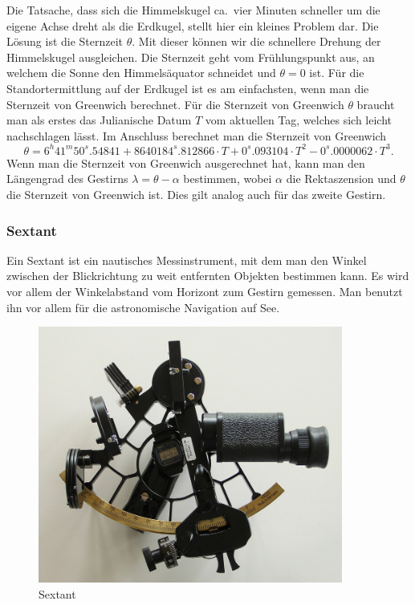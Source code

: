 Die Tatsache, dass sich die Himmelskugel  ca.~vier Minuten schneller
um die eigene Achse dreht als die Erdkugel, stellt hier ein kleines
Problem dar.
Die Lösung ist die Sternzeit $\theta$. 
%
Mit dieser können wir die schnellere Drehung der Himmelskugel ausgleichen.
Die Sternzeit geht vom Frühlungspunkt aus, an welchem die Sonne den Himmelsäquator schneidet und $\theta=0$ ist. 
Für die Standortermittlung auf der Erdkugel ist es am einfachsten, wenn man die Sternzeit von Greenwich berechnet. 
Für die Sternzeit von Greenwich $\theta$ braucht man als erstes das Julianische Datum $T$ vom aktuellen Tag, welches sich leicht nachschlagen lässt.
%
Im Anschluss berechnet man die Sternzeit von Greenwich
\[
\theta = 6^h 41^m 50^s.54841 + 8640184^s.812866 \cdot T + 0^s.093104 \cdot T^2 - 0^s.0000062 \cdot T^3.
\]
Wenn man die Sternzeit von Greenwich ausgerechnet hat, kann man den Längengrad des Gestirns $\lambda = \theta - \alpha$ bestimmen, wobei $\alpha$ die Rektaszension und $\theta$ die Sternzeit von Greenwich ist.
Dies gilt analog auch für das zweite Gestirn.

\subsubsection{Sextant}
%
Ein Sextant ist ein nautisches Messinstrument, mit dem man den
Winkel zwischen der Blickrichtung zu weit entfernten Objekten
bestimmen kann. Es wird vor allem der Winkelabstand vom Horizont
zum Gestirn gemessen.
Man benutzt ihn vor allem für die astronomische Navigation auf See.
\begin{figure}
\centering
	\includegraphics[width=10cm]{papers/nav/bilder/sextant.jpg}
	\caption[Sextant]{Sextant}
\end{figure}
